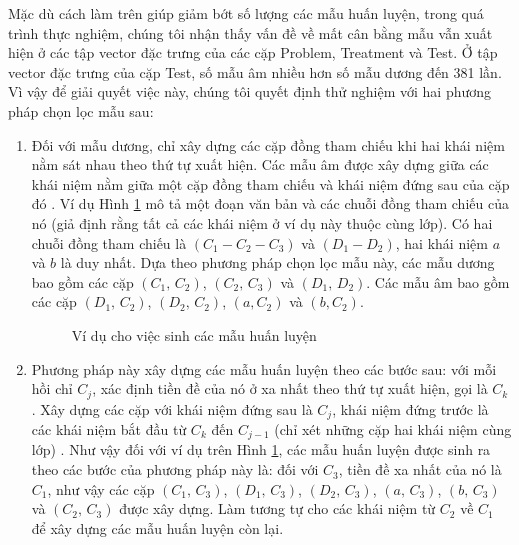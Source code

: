 Mặc dù cách làm trên giúp giảm bớt số lượng các mẫu huấn luyện, trong quá trình thực nghiệm, chúng tôi nhận thấy vấn đề về mất cân bằng mẫu vẫn xuất hiện ở các tập vector đặc trưng của các cặp Problem, Treatment và Test. Ở tập vector đặc trưng của cặp Test, số mẫu âm nhiều hơn số mẫu dương đến 381 lần. Vì vậy để giải quyết việc này, chúng tôi quyết định thử nghiệm với hai phương pháp chọn lọc mẫu sau:
\begin{enumerate}
\item Đối với mẫu dương, chỉ xây dựng các cặp đồng tham chiếu khi hai khái niệm nằm sát nhau theo thứ tự xuất hiện. Các mẫu âm được xây dựng giữa các khái niệm nằm giữa một cặp đồng tham chiếu và khái niệm đứng sau của cặp đó \cite{Soon2001}. Ví dụ Hình \ref{fig:insgen-eg} mô tả một đoạn văn bản và các chuỗi đồng tham chiếu của nó (giả định rằng tất cả các khái niệm ở ví dụ này thuộc cùng lớp). Có hai chuỗi đồng tham chiếu là $(C_1-C_2-C_3)$ và $(D_1-D_2)$, hai khái niệm $a$ và $b$ là duy nhất. Dựa theo phương pháp chọn lọc mẫu này, các mẫu dương bao gồm các cặp $(C_1,\,C_2)$, $(C_2,\,C_3)$ và $(D_1,\,D_2)$. Các mẫu âm bao gồm các cặp $(D_1,\,C_2)$, $(D_2,\,C_2)$, $(a,C_2)$ và $(b,C_2)$.

\begin{figure}[ht]
\centering
{}
\caption{Ví dụ cho việc sinh các mẫu huấn luyện\label{fig:insgen-eg}}
\end{figure}

\item Phương pháp này xây dựng các mẫu huấn luyện theo các bước sau: với mỗi hồi chỉ $C_j$, xác định tiền đề của nó ở xa nhất theo thứ tự xuất hiện, gọi là $C_k$. Xây dựng các cặp với khái niệm đứng sau là $C_j$, khái niệm đứng trước là các khái niệm bắt đầu từ $C_k$ đến $C_{j-1}$ (chỉ xét những cặp hai khái niệm cùng lớp) \cite{VincentNg2002[2]}. Như vậy đối với ví dụ trên Hình \ref{fig:insgen-eg}, các mẫu  huấn luyện được sinh ra theo các bước của phương pháp này là: đối với $C_3$, tiền đề xa nhất của nó là $C_1$, như vậy các cặp $(C_1,\,C_3)$, $(D_1,\,C_3)$, $(D_2,\,C_3)$, $(a,\,C_3)$, $(b,\,C_3)$ và $(C_2,\,C_3)$ được xây dựng. Làm tương tự cho các khái niệm từ $C_2$ về $C_1$ để xây dựng các mẫu huấn luyện còn lại.
\end{enumerate}

